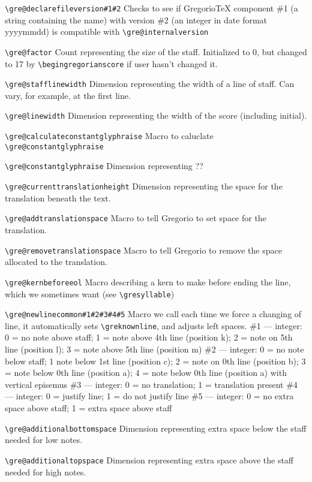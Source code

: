 \verb=\gre@declarefileversion#1#2=%
	Checks to see if GregorioTeX component \#1 (a string containing the name) with version \#2 (an integer in date format yyyymmdd) is compatible with \verb=\gre@internalversion=

\verb=\gre@factor=%
	Count representing the size of the staff.  Initialized to 0, but changed to 17 by \verb=\begingregorianscore= if user hasn't changed it.
	
\verb=\gre@stafflinewidth=%
	Dimension representing the width of a line of staff.  Can vary, for example, at the first line.

\verb=\gre@linewidth=%
	Dimension representing the width of the score (including initial).

\verb=\gre@calculateconstantglyphraise=%
	Macro to caluclate \verb=\gre@constantglyphraise=

\verb=\gre@constantglyphraise=%
	Dimension representing ??

\verb=\gre@currenttranslationheight=%
	Dimension representing the space for the translation beneath the text.

\verb=\gre@addtranslationspace=%
	Macro to tell Gregorio to set space for the translation.

\verb=\gre@removetranslationspace=%
	Macro to tell Gregorio to remove the space allocated to the translation.

\verb=\gre@kernbeforeeol=%
	Macro describing a kern to make before ending the line, which we sometimes want (see \verb=\gresyllable=)

\verb=\gre@newlinecommon#1#2#3#4#5=%
	Macro we call each time we force a changing of line, it automatically sets \verb=\greknownline=, and adjusts left spaces.
	\#1 --- integer: 0 = no note above staff; 1 = note above 4th line (position k); 2 = note on 5th line (position l); 3 = note above 5th line (position m)
	\#2 --- integer: 0 = no note below staff; 1 note below 1st line (position c); 2 = note on 0th line (position b); 3 = note below 0th line (position a); 4 = note below 0th line (position a) with vertical episemus
	\#3 --- integer: 0 = no translation; 1 = translation present
	\#4 --- integer: 0 = justify line; 1 = do not justify line
	\#5 --- integer: 0 = no extra space above staff; 1 = extra space above staff

\verb=\gre@additionalbottomspace=%
	Dimension representing extra space below the staff needed for low notes.

\verb=\gre@additionaltopspace=%
	Dimension representing extra space above the staff needed for high notes.

